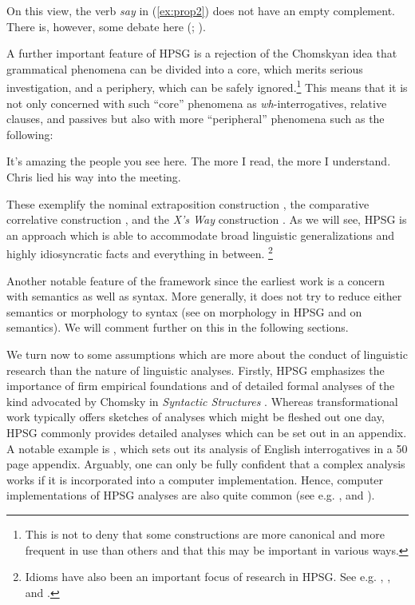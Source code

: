 \documentclass[output=paper
	        ,collection
	        ,collectionchapter
 	        ,biblatex
                ,babelshorthands
                ,newtxmath
                ,draftmode
                ,colorlinks, citecolor=brown
]{langscibook}
\begin{document}
On this view, the verb \emph{say} in (\ref{ex:prop2}) does not have an empty complement. There is, however, some debate here (\citealp{SF94a,Mueller2004e}; ).

A further important feature of HPSG is a rejection of the Chomskyan idea that grammatical phenomena can be divided into a core, which merits serious investigation, and a periphery, which can be safely ignored.\footnote{%
  This is not to deny that some constructions are more canonical and more frequent in use than others and that this may be important in various ways.}
%
This means that it is not only concerned with such ``core'' phenomena as \emph{wh}-interrogatives, relative clauses, and passives but also with more ``peripheral'' phenomena such as the following:


\eal\label{ex:prop3}
\ex\label{ex:prop3a}
It’s amazing the people you see here.
\ex\label{ex:prop3b}
The more I read, the more I understand.
\ex\label{ex:prop3c}
Chris lied his way into the meeting.
\zl

These exemplify the nominal extraposition construction \citep{ML96a}, the comparative correlative construction \citep{Abeille2006a,AB2008a-u,Borsley2011a-u}, and the \emph{X’s Way} construction \parencites{KF99a}[Section~7.4]{Sag2012a}. As we will see, HPSG is an approach which is able to accommodate broad linguistic generalizations and highly idiosyncratic facts and everything in between.%
%
\footnote{Idioms have also been an important focus of research in HPSG. See e.g. , , and .}
%

Another notable feature of the framework since the earliest work is a concern with semantics as well as syntax. More generally, it does not try to reduce either semantics or morphology to syntax (see  on morphology in HPSG and  on semantics). We will comment further on this in the following sections.

We turn now to some assumptions which are more about the conduct of linguistic research than the nature of linguistic analyses. Firstly, HPSG emphasizes the importance of firm empirical foundations and of detailed formal analyses of the kind advocated by Chomsky in \emph{Syntactic Structures} \citep{Chomsky57a}\addpages. Whereas transformational work typically offers sketches of analyses which might be fleshed out one day, HPSG commonly provides detailed analyses which can be set out in an appendix. A notable example is \citet{GSag2000a-u}, which sets out its analysis of English interrogatives in a 50 page appendix. Arguably, one can only be fully confident that a complex analysis works if it is incorporated into a computer implementation. Hence, computer implementations of HPSG analyses are also quite common (see e.g. \citealp{Babel,MuellerCoreGram,Copestake2002a,BDFPS2010a-u,Bender2016}, and ).
\end{document}
